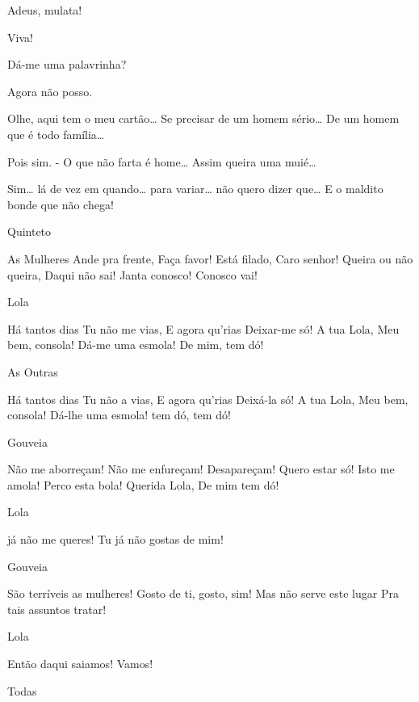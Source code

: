  Adeus, mulata!

 Viva!

  Dá-me uma palavrinha?

 Agora não posso.

 Olhe, aqui tem o meu cartão\ldots{} Se precisar de um homem sério\ldots{}
De um homem que é todo família\ldots{}

  Pois sim. 
- O que não farta é home\ldots{} Assim queira uma muié\ldots{} 

  Sim\ldots{} lá de vez em quando\ldots{} para variar\ldots{} não
quero dizer que\ldots{}  E o maldito bonde que não chega! 



 Quinteto

 As Mulheres
 Ande pra frente,
 Faça favor!
 Está filado,
 Caro senhor!
 Queira ou não queira,
 Daqui não sai!
 Janta conosco!
 Conosco vai!

 Lola

 Há tantos dias
 Tu não me vias,
 E agora qu’rias
 Deixar-me só!
 A tua Lola,
 Meu bem, consola!
 Dá-me uma esmola!
 De mim, tem dó!

 As Outras

 Há tantos dias
 Tu não a vias,
 E agora qu’rias
 Deixá-la só!
 A tua Lola,
 Meu bem, consola!
 Dá-lhe uma esmola!
 tem dó, tem dó!

 Gouveia

 Não me aborreçam!
 Não me enfureçam!
 Desapareçam!
 Quero estar só!
 Isto me amola!
 Perco esta bola!
 Querida Lola,
 De mim tem dó!

 Lola

 já não me queres!
 Tu já não gostas de mim!

 Gouveia

 São terríveis as mulheres!
 Gosto de ti, gosto, sim!
 Mas não serve este lugar
 Pra tais assuntos tratar!

 Lola

 Então daqui saiamos!
 Vamos!

 Todas

